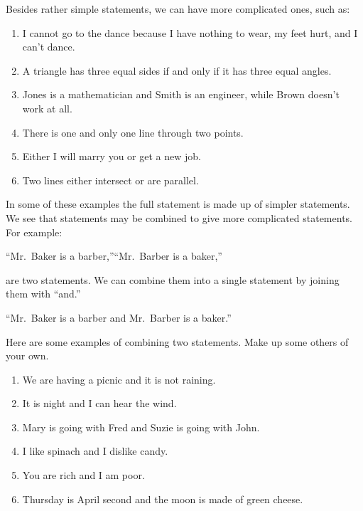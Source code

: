 \documentclass[11pt]{book}
\begin{document}
Besides rather simple statements, we can have more complicated ones, such as:

\begin{enumerate}[label=(\alph*), leftmargin=2.2em, itemsep=1pt, topsep=3pt]
\item I cannot go to the dance because I have nothing to wear, my feet hurt, and
      I can't dance.
\item A triangle has three equal sides if and only if it has three equal angles.
\item Jones is a mathematician and Smith is an engineer, while Brown doesn't work
      at all.
\item There is one and only one line through two points.
\item Either I will marry you or get a new job.
\item Two lines either intersect or are parallel.
\end{enumerate}

In some of these examples the full statement is made up of simpler statements. We
see that statements may be combined to give more complicated statements. For
example:

\begin{center}
``Mr.\ Baker is a barber,''\qquad ``Mr.\ Barber is a baker,''
\end{center}

\noindent are two statements. We can combine them into a single statement by
joining them with ``and.''

\begin{center}
``Mr.\ Baker is a barber and Mr.\ Barber is a baker.''
\end{center}

Here are some examples of combining two statements. Make up some others of your
own.

\begin{enumerate}[label=(\alph*), leftmargin=2.2em, itemsep=1pt, topsep=3pt]
\item We are having a picnic and it is not raining.
\item It is night and I can hear the wind.
\item Mary is going with Fred and Suzie is going with John.
\item I like spinach and I dislike candy.
\item You are rich and I am poor.
\item Thursday is April second and the moon is made of green cheese.
\end{enumerate}
\end{document}
